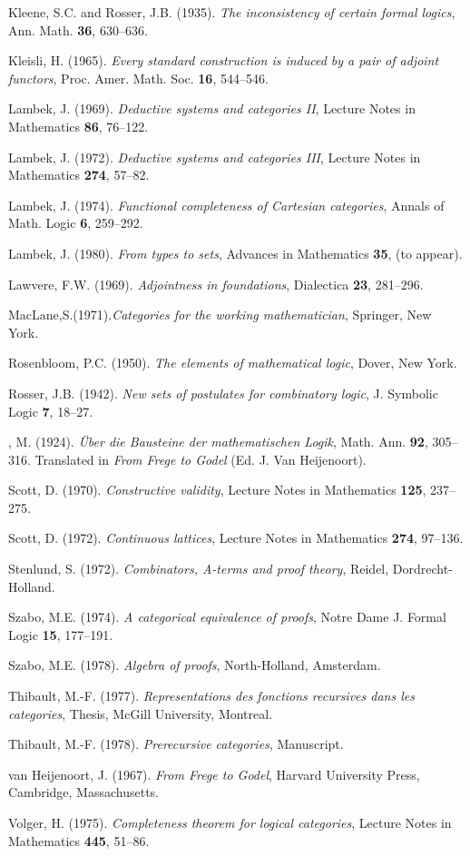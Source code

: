 \begin{thebibliography}{888}
 Kleene, S.C. and Rosser, J.B. (1935). {\it The inconsistency of certain formal logics}, Ann. Math. \textbf{36}, 630--636.

 Kleisli, H. (1965). {\it Every standard construction is induced by a pair of adjoint functors}, 
Proc. Amer. Math. Soc. \textbf{16}, 544--546.

 Lambek, J. (1969). {\it Deductive systems and categories II}, Lecture Notes in Mathematics {\bf 86}, 76--122.

 Lambek, J. (1972). {\it Deductive systems and categories III}, Lecture Notes in Mathematics {\bf 274}, 57--82.

 Lambek, J. (1974). {\it Functional completeness of Cartesian categories}, Annals of Math. Logic {\bf 6}, 259--292.

 Lambek, J. (1980). {\it From types to sets}, Advances in Mathematics {\bf 35}, (to appear).

 Lawvere, F.W. (1969). {\it Adjointness in foundations}, Dialectica {\bf 23}, 281--296.

 MacLane,S.(1971).{\it Categories for the working mathematician}, Springer, New York.

 Rosenbloom, P.C. (1950). {\it The elements of mathematical logic}, Dover, New York.

 Rosser, J.B. (1942). {\it New sets of postulates for combinatory logic}, J. Symbolic Logic {\bf 7}, 18--27.

 \schon, M. (1924). {\it \"Uber die Bausteine der mathematischen Logik}, Math. Ann. {\bf 92}, 305--316. 
Translated in {\it From Frege to Godel} (Ed. J. Van Heijenoort).

 Scott, D. (1970). {\it Constructive validity}, Lecture Notes in Mathematics {\bf 125}, 237--275.

 Scott, D. (1972). {\it Continuous lattices}, Lecture Notes in Mathematics {\bf 274}, 97--136.

 Stenlund, S. (1972). {\it Combinators, A-terms and proof theory}, Reidel, Dordrecht-Holland.

 Szabo, M.E. (1974). {\it A categorical equivalence of proofs}, Notre Dame J. Formal Logic {\bf 15}, 177--191.

 Szabo, M.E. (1978). {\it Algebra of proofs}, North-Holland, Amsterdam.

 Thibault, M.-F. (1977). {\it Representations des fonctions recursives dans les categories}, 
Thesis, McGill University, Montreal.

 Thibault, M.-F. (1978). {\it Prerecursive categories}, Manuscript.

 van Heijenoort, J. (1967). {\it From Frege to Godel}, Harvard University Press, Cambridge, Massachusetts.

 Volger, H. (1975). {\it Completeness theorem for logical categories}, Lecture Notes in Mathematics {\bf 445}, 51--86.


\end{thebibliography}

